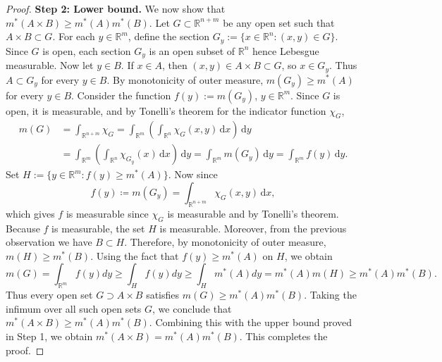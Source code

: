 \begin{proof}
\textbf{Step 2: Lower bound.} We now show that $m^{*}(A\times B)\ge m^{*}(A)m^{*}(B)$. Let $G\subset \mathbb{R}^{n+m}$ be any open set such that $A\times B\subset G$. For each $y\in \mathbb{R}^{m}$, define the section $G_{y}:=\{x\in \mathbb{R}^{n}:(x,y)\in G\}$. Since $G$ is open, each section $G_{y}$ is an open subset of $\mathbb{R}^{n}$ hence Lebesgue measurable. Now let $y\in B$. If $x\in A$, then $(x,y)\in A\times B\subset G$, so $x\in G_{y}$. Thus $A\subset G_{y}$ for every $y\in B$. By monotonicity of outer measure, $m(G_{y})\ge m^{*}(A)$ for every $y\in B$. Consider the function $f(y):=m(G_{y})$, $y\in \mathbb{R}^{m}$. Since $G$ is open, it is measurable, and by Tonelli's theorem for the indicator function $\chi_{G}$,
\begin{align*}
    m(G) &= \int _{\mathbb{R} ^{n + m}} \chi _G = \int _{\mathbb{R} ^m} \left( \int _{\mathbb{R} ^n} \chi_G(x, y) \, \mathrm{d} x  \right) \, \mathrm{d} y \\
    &= \int _{\mathbb{R} ^m} \left( \int _{\mathbb{R} ^n} \chi _{G_y}(x) \, \mathrm{d} x  \right) \, \mathrm{d} y = \int _{\mathbb{R} ^m} m(G_y) \, \mathrm{d} y = \int _{\mathbb{R} ^m} f(y) \, \mathrm{d} y.   
\end{align*}
Set $H:=\{y\in \mathbb{R}^{m}:f(y)\ge m^{*}(A)\}$. Now since
\[
    f(y) \coloneqq m(G_y) = \int_{\mathbb{R}^{n+m}} \chi _{G}(x, y) \, \mathrm{d} x,
\]
which gives \(f\) is measurable since \(\chi _G\) is measurable and by Tonelli's theorem. 
Because $f$ is measurable, the set $H$ is measurable. Moreover, from the previous observation we have $B\subset H$. Therefore, by monotonicity of outer measure, $m(H)\ge m^{*}(B)$. Using the fact that $f(y)\ge m^{*}(A)$ on $H$, we obtain
$$m(G)=\int_{\mathbb{R}^{m}}f(y)dy \ge \int_{H}f(y)dy \ge \int_{H}m^{*}(A)dy = m^{*}(A)m(H) \ge m^{*}(A)m^{*}(B).$$
Thus every open set $G \supset A \times B$ satisfies $m(G) \ge m^{*}(A)m^{*}(B)$. Taking the infimum over all such open sets $G$, we conclude that $m^{*}(A \times B) \ge m^{*}(A)m^{*}(B)$. Combining this with the upper bound proved in Step 1, we obtain $m^{*}(A \times B) = m^{*}(A)m^{*}(B)$. This completes the proof.
\end{proof}